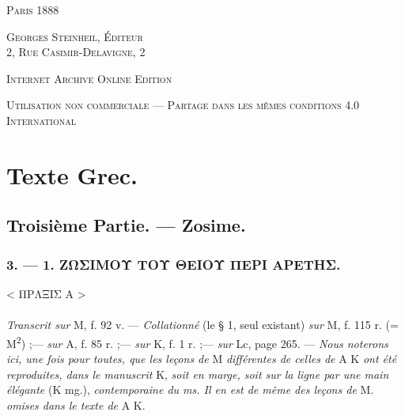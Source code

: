 \documentclass[a4paper, 11pt, oneside, polutonikogreek, french]{article}
\begin{document}
\begin{titlepage}
        \vspace*{\fill}

	\vspace{1\baselineskip}

	{\small\scshape Paris 1888}
	
	{\small\scshape{Georges Steinheil, Éditeur \\2, Rue Casimir-Delavigne, 2}}
	
	\vspace{0.5\baselineskip} %

    \scshape Internet Archive Online Edition  %
	
	{\scshape\small Utilisation non commerciale --- Partage dans les mêmes conditions 4.0 International} %
\end{titlepage}
\setlength{\parskip}{1mm plus1mm minus1mm}
\clearpage
\tableofcontents
\clearpage
\section{Texte Grec.}
\subsection{Troisième Partie. --- Zosime.}
\subsubsection{3. --- 1. ΖΩΣΙΜΟΥ ΤΟΥ ΘΕΙΟΥ ΠΕΡΙ ΑΡΕΤΗΣ.}
\begin{center}
< ΠΡΛΞΙΣ Α >
\end{center}
\paragraph{}
\emph{Transcrit sur} M, f. 92 v. --- \emph{Collationné} (le § 1, seul existant) \emph{sur} M, f. 115 r. (= M\textsuperscript{2}) ;--- \emph{sur} A, f. 85 r. ;--- \emph{sur} K, f. 1 r. ;--- \emph{sur} Lc, page 265. --- \emph{Nous noterons ici, une fois pour toutes, que les leçons de} M \emph{différentes de celles de} A K \emph{ont été reproduites, dans le manuscrit} K, \emph{soit en marge, soit sur la ligne par une main élégante} (K mg.), \emph{contemporaine du ms. Il en est de même des leçons de} M. \emph{omises dans le texte de} A K.

\bigskip
\end{document}
